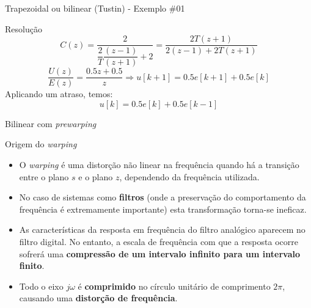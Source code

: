 \begin{frame}{Trapezoidal ou bilinear (Tustin) - Exemplo \#01}
\begin{block}{Resolução}
	\[ C(z)=\dfrac{2}{\dfrac{2}{T}\dfrac{(z-1)}{(z+1)}+2}=\dfrac{2T(z+1)}{2(z-1)+2T(z+1)} \]
	\[ \dfrac{U(z)}{E(z)}=\dfrac{\num{0,5}z+\num{0,5}}{z}\Rightarrow u[k+1]=\num{0,5}e[k+1]+\num{0,5}e[k] \]
	Aplicando um atraso, temos:
	\[ u[k]=\num{0,5}e[k]+\num{0,5}e[k-1] \]
\end{block}
\end{frame}

\cprotect{}

\begin{frame}{Bilinear com \textit{prewarping}}
\begin{block}{Origem do \textit{warping}}
\begin{itemize}
    \item O \textit{warping} é uma distorção não linear na frequência quando há a transição entre o plano $s$ e o plano $z$, dependendo da frequência utilizada.
    \item No caso de sistemas como \textbf{filtros} (onde a preservação do comportamento da frequência é extremamente importante) esta transformação torna-se ineficaz.
    \item As características da resposta em frequência do filtro analógico aparecem no filtro digital. No entanto, a escala de frequência com que a resposta ocorre sofrerá uma \textbf{compressão de um intervalo infinito para um intervalo finito}.
    \item Todo o eixo $j\omega$ é \textbf{comprimido} no círculo unitário de comprimento $2\pi$, causando uma \textbf{distorção de frequência}.
\end{itemize}
\end{block}
\end{frame}

